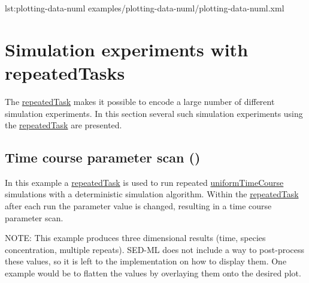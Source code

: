 {lst:plotting-data-numl}
{examples/plotting-data-numl/plotting-data-numl.xml}

\pagebreak
\section{Simulation experiments with repeatedTasks}
The \hyperref[class:repeatedTask]{repeatedTask} makes it possible to encode a large number of different simulation experiments. In this section several such simulation experiments using the \hyperref[class:repeatedTask]{repeatedTask} are presented.

\subsection{Time course parameter scan ()}
In this example a \hyperref[class:repeatedTask]{repeatedTask} is used to run repeated \hyperref[class:uniformTimeCourse]{uniformTimeCourse} simulations with a deterministic simulation algorithm. Within the \hyperref[class:repeatedTask]{repeatedTask} after each run the parameter value is changed, resulting in a time course parameter scan.

NOTE: This example produces three dimensional results (time, species concentration, multiple repeats).  SED-ML \currentLV does not include a way to post-process these values, so it is left to the implementation on how to display them. One example would be to flatten the values by overlaying them onto the desired plot.


